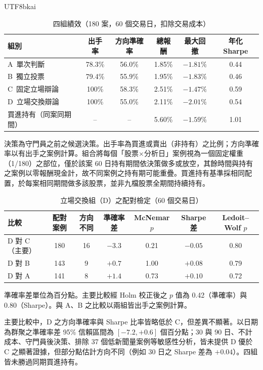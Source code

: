 \documentclass[12pt,a4paper]{article}
\newcommand{\grp}[1]{\textsf{#1}}
\begin{document}
\begin{CJK}{UTF8}{bkai}
\begin{table}[H]
\centering\small
\caption{四組績效（180 案，60 個交易日，扣除交易成本）}
\label{tab:main}
\begin{tabular}{@{}lccccc@{}}
\toprule
組別 & 出手率 & 方向準確率 & 總報酬 & 最大回撤 & 年化 Sharpe \\
\midrule
\grp{A}\ 單次判斷 & 78.3\% & 56.0\% & 1.85\% & $-1.81\%$ & 0.44 \\
\grp{B}\ 獨立投票 & 79.4\% & 55.9\% & 1.95\% & $-1.83\%$ & 0.46 \\
\grp{C}\ 固定立場辯論 & 100\% & 58.3\% & 2.51\% & $-1.47\%$ & 0.59 \\
\grp{D}\ 立場交換辯論 & 100\% & 55.0\% & 2.11\% & $-2.01\%$ & 0.54 \\
\midrule
買進持有（同案同期間） & -- & -- & 5.60\% & $-1.59\%$ & 1.01 \\
\bottomrule
\end{tabular}
\par\smallskip
\raggedright\footnotesize 決策為守門員之前之候選決策。出手率為買進或賣出（非持有）之比例；方向準確率以有出手之案例計算。組合將每個「股票×分析日」案例視為一個固定權重（1/180）之部位，僅於該案 60 日持有期間依決策做多或放空，其餘時間與持有之案例以零報酬現金計，故不同案例之持有期可能重疊。買進持有基準採相同配置，於每案相同期間做多該股票，並非九檔股票全期間持續持有。
\end{table}

\begin{table}[H]
\centering\small
\caption{立場交換組（\grp{D}）之配對檢定（60 個交易日）}
\label{tab:tests}
\begin{tabular}{@{}lcccccc@{}}
\toprule
比較 & 配對案例 & 方向不同 & 準確率差 & McNemar $p$ & Sharpe 差 & Ledoit--Wolf $p$ \\
\midrule
\grp{D} 對 \grp{C}（主要） & 180 & 16 & $-3.3$ & 0.21 & $-0.05$ & 0.80 \\
\grp{D} 對 \grp{B} & 143 & 9 & $+0.7$ & 1.00 & $+0.08$ & 0.79 \\
\grp{D} 對 \grp{A} & 141 & 8 & $+1.4$ & 0.73 & $+0.10$ & 0.72 \\
\bottomrule
\end{tabular}
\par\smallskip
\raggedright\footnotesize 準確率差單位為百分點。主要比較經 Holm 校正後之 $p$ 值為 0.42（準確率）與 0.80（Sharpe）。與 \grp{A}、\grp{B} 之比較以兩組皆出手之案例計算。
\end{table}

主要比較中，\grp{D} 之方向準確率與 Sharpe 比率皆略低於 \grp{C}，但差異不顯著。以日期為群聚之準確率差 95\% 信賴區間為 $[-7.2, +0.6]$ 個百分點；30 與 90 日、不計成本、守門員後決策、排除 37 個低新聞量案例等敏感性分析，皆未提供 \grp{D} 優於 \grp{C} 之顯著證據，但部分點估計方向不同（例如 30 日之 Sharpe 差為 $+0.04$）。四組皆未勝過同期買進持有。


\end{CJK}
\end{document}
